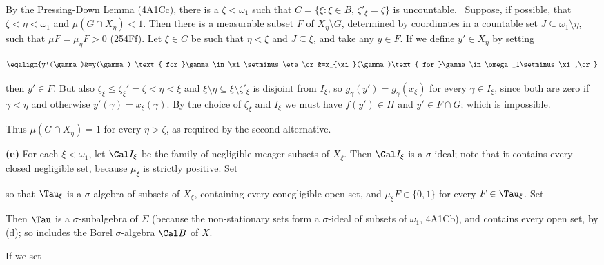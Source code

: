 {By the Pressing-Down Lemma (4A1Cc), there is a $\zeta<\omega_1$
such that $C=\{\xi:\xi\in B,\,\zeta'_{\xi}=\zeta\}$ is uncountable.
\Quer\ Suppose, if possible, that $\zeta<\eta<\omega_1$ and
$\mu(G\cap X_{\eta})<1$.   Then there is a measurable subset $F$ of
$X_{\eta}\setminus G$, determined by coordinates in a countable set
$J\subseteq\omega_1\setminus\eta$, such that $\mu F=\mu_{\eta}F>0$
(254Ff).   Let $\xi\in C$ be
such that $\eta<\xi$ and $J\subseteq\xi$, and take any $y\in F$.   If we
define $y'\in X_{\eta}$ by setting

$$\eqalign{y'(\gamma)&=y(\gamma)
  \text{ for }\gamma\in\xi\setminus\eta\cr
&=x_{\xi}(\gamma)\text{ for }\gamma\in \omega_1\setminus\xi,\cr}$$

\noindent then $y'\in F$.   But also
$\zeta_{\xi}\le\zeta_{\xi}'=\zeta<\eta<\xi$ and
$\xi\setminus\eta\subseteq\xi\setminus\zeta'_{\xi}$ is disjoint from
$I_{\xi}$, so $g_{\gamma}(y')=g_{\gamma}(x_{\xi})$ for every
$\gamma\in I_{\xi}$, since both are zero if $\gamma<\eta$ and otherwise
$y'(\gamma)=x_{\xi}(\gamma)$.   By the choice of $\zeta_{\xi}$ and
$I_{\xi}$ we must have $f(y')\in H$ and $y'\in F\cap G$;  which is
impossible.\ \Bang

Thus $\mu(G\cap X_{\eta})=1$ for every $\eta>\zeta$, as required by the
second alternative.\ \Qed

\medskip

{\bf (e)} For each $\xi<\omega_1$, let $\Cal I_{\xi}$ be the family of
negligible meager subsets of $X_{\xi}$.   Then $\Cal I_{\xi}$ is a
$\sigma$-ideal;  note that it contains every closed negligible set,
because $\mu_{\xi}$ is strictly positive.   Set


\noindent so that $\Tau_{\xi}$ is a $\sigma$-algebra of subsets of
$X_{\xi}$, containing every conegligible open set, and
$\mu_{\xi}F\in\{0,1\}$ for every $F\in\Tau_{\xi}$.   Set


\noindent Then $\Tau$ is a $\sigma$-subalgebra of $\Sigma$ (because the
non-stationary sets form a $\sigma$-ideal of subsets of $\omega_1$,
4A1Cb), and contains every open set, by (d);  so includes the Borel
$\sigma$-algebra $\Cal B$ of $X$.

If we set


}
